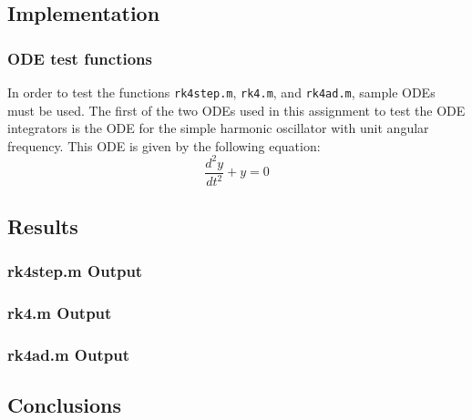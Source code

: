 \documentclass[10pt]{article}
\def\code#1{\texttt{#1}} %
\begin{document}
\subsection*{Implementation}

\subsubsection*{ODE test functions} %

In order to test the functions \code{rk4step.m}, \code{rk4.m}, and \code{rk4ad.m}, sample ODEs must be
used. The first of the two ODEs used in this assignment to test the ODE integrators is the ODE for the
simple harmonic oscillator with unit angular frequency. This ODE is given by the following equation:
$$\frac{d^2y}{dt^2} + y = 0$$


\subsection*{Results}

\subsubsection*{rk4step.m Output}

\subsubsection*{rk4.m Output}

\subsubsection*{rk4ad.m Output}


\subsection*{Conclusions}
\end{document}
